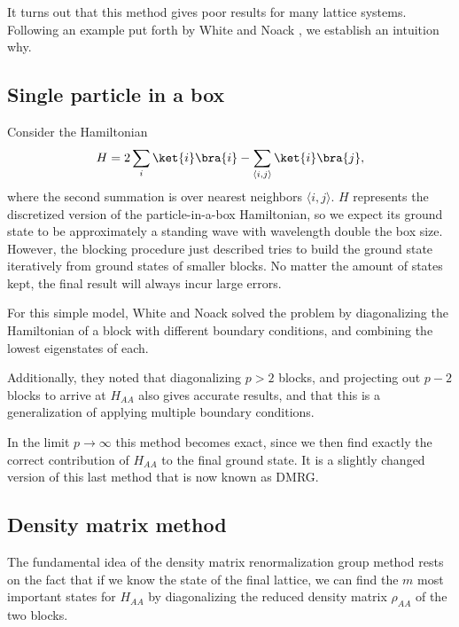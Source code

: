 It turns out that this method gives poor results for many lattice systems. Following an
example put forth by White and Noack \cite{white1992real}, we establish an intuition
why.

\subsection{Single particle in a box}

Consider the Hamiltonian
\begin{equation}
  H = 2 \sum_i \ket{i}\bra{i} - \sum_{\langle i, j \rangle} \ket{i}\bra{j},
\end{equation}
where the second summation is over nearest neighbors $\langle i,
j \rangle$. $H$ represents the discretized version of the
particle-in-a-box Hamiltonian, so we expect its ground state to be
approximately a standing wave with wavelength double the box size.
However, the blocking procedure just described tries to build the ground
state iteratively from ground states of smaller blocks. No matter the
amount of states kept, the final result will always incur large errors.

For this simple model, White and Noack solved the problem by diagonalizing
the Hamiltonian of a block with different boundary conditions, and
combining the lowest eigenstates of each.

Additionally, they noted that
diagonalizing $p > 2$ blocks, and projecting out $p - 2$ blocks to arrive
at $H_{AA}$ also gives accurate results, and that this is a generalization
of applying multiple boundary conditions.

In the limit $p \to \infty$
this method becomes exact, since we then find exactly the correct
contribution of $H_{AA}$ to the final ground state. It is a slightly
changed version of this last method that is now known as DMRG.

\subsection{Density matrix method}

The fundamental idea of the density matrix renormalization group method
rests on the fact that if we know the state of the final lattice, we can find the $m$
most important states for $H_{AA}$ by diagonalizing the reduced density
matrix $\rho_{AA}$ of the two blocks.

